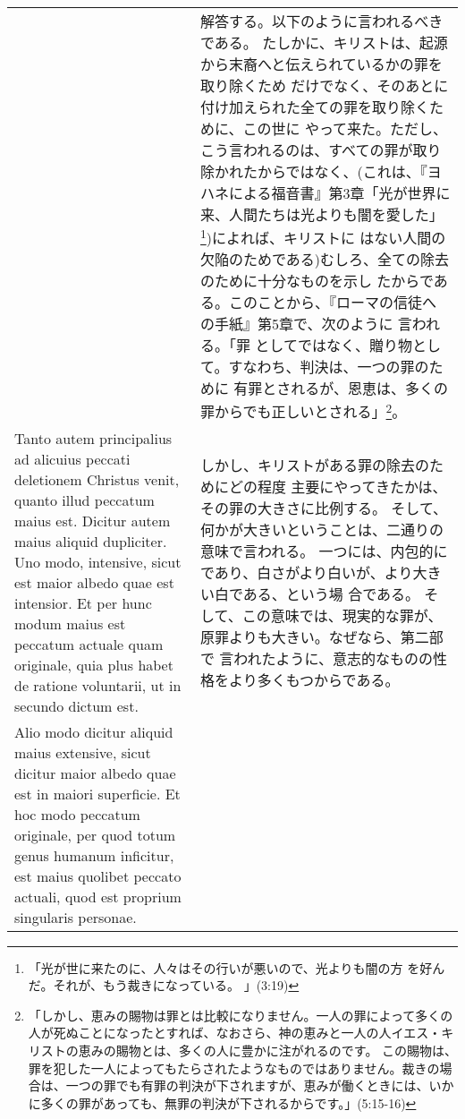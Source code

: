\documentclass[10pt]{jsarticle} %
\begin{document}
\begin{longtable}{p{21em}p{21em}}
&

解答する。以下のように言われるべきである。
たしかに、キリストは、起源から末裔へと伝えられているかの罪を取り除くため
 だけでなく、そのあとに付け加えられた全ての罪を取り除くために、この世に
 やって来た。ただし、こう言われるのは、すべての罪が取り除かれたからではなく、(これは、『ヨ
 ハネによる福音書』第3章「光が世界に来、人間たちは光よりも闇を愛した」
 \footnote{「光が世に来たのに、人々はその行いが悪いので、光よりも闇の方
 を好んだ。それが、もう裁きになっている。 」(3:19)})によれば、キリストに
 はない人間の欠陥のためである)むしろ、全ての除去のために十分なものを示し
 たからである。このことから、『ローマの信徒への手紙』第5章で、次のように
 言われる。「罪
としてではなく、贈り物として。すなわち、判決は、一つの罪のために
 有罪とされるが、恩恵は、多くの罪からでも正しいとされる」\footnote{「しかし、恵みの賜物は罪とは比較になりません。一人の罪によって多くの人が死ぬことになったとすれば、なおさら、神の恵みと一人の人イエス・キリストの恵みの賜物とは、多くの人に豊かに注がれるのです。 この賜物は、罪を犯した一人によってもたらされたようなものではありません。裁きの場合は、一つの罪でも有罪の判決が下されますが、恵みが働くときには、いかに多くの罪があっても、無罪の判決が下されるからです。」(5:15-16)}。





\\




Tanto autem principalius ad alicuius peccati
deletionem Christus venit, quanto illud peccatum maius est. 
Dicitur
autem maius aliquid dupliciter. Uno modo, intensive, sicut est maior
albedo quae est intensior. Et per hunc modum maius est peccatum actuale
quam originale, quia plus habet de ratione voluntarii, ut in secundo
dictum est. 


&

しかし、キリストがある罪の除去のためにどの程度
 主要にやってきたかは、その罪の大きさに比例する。
そして、何かが大きいということは、二通りの意味で言われる。
一つには、内包的にであり、白さがより白いが、より大きい白である、という場
 合である。
そして、この意味では、現実的な罪が、原罪よりも大きい。なぜなら、第二部で
 言われたように、意志的なものの性格をより多くもつからである。



\\


Alio modo dicitur aliquid maius extensive, sicut dicitur
maior albedo quae est in maiori superficie. Et hoc modo peccatum
originale, per quod totum genus humanum inficitur, est maius quolibet
peccato actuali, quod est proprium singularis personae. 



\end{longtable}
\end{document}
